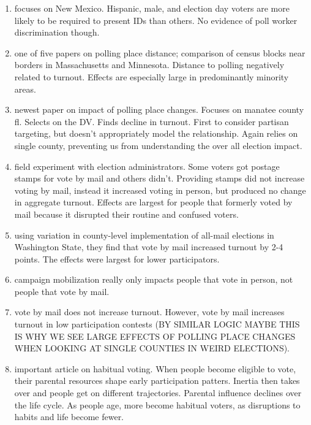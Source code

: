 \documentclass[12pt]{article}
\begin{document}
\begin{enumerate}
\item \citet{atkeson2010new} focuses on New Mexico. Hispanic, male, and election day voters are more likely to be required to present IDs than others. No evidence of poll worker discrimination though. 

\item \citet{cantoni2016} one of five papers on polling place distance;  comparison of census blocks near borders in Massachusetts and Minnesota. Distance to polling negatively related to turnout. Effects are especially large in predominantly minority areas. 



\item \citet{amos2017reprecincting} newest paper on impact of polling place changes. Focuses on manatee county fl. Selects on the DV. Finds decline in turnout. First to consider partisan targeting, but doesn't appropriately model the relationship. Again relies on single county, preventing us from understanding the over all election impact. 

\item \citet{michelson2012effect} field experiment with election administrators. Some voters got postage stamps for vote by mail and others didn't. Providing stamps did not increase voting by mail, instead it increased voting in person, but produced no change in aggregate turnout. Effects are largest for people that formerly voted by mail because it disrupted their routine and confused voters. 


\item \citet{gerber2013identifying} using variation in county-level implementation of all-mail elections in Washington State, they find that vote by mail increased turnout by 2-4 points. The effects were largest for lower participators. 

\item \citet{arceneaux2012get} campaign mobilization really only impacts people that vote in person, not people that vote by mail. 

\item \citet{kousser2007does} vote by mail does not increase turnout. However, vote by mail increases turnout in low participation contests (BY SIMILAR LOGIC MAYBE THIS IS WHY WE SEE LARGE EFFECTS OF POLLING PLACE CHANGES WHEN LOOKING AT SINGLE COUNTIES IN WEIRD ELECTIONS). 

\item \citet{plutzer2002becoming} important article on habitual voting. When people become eligible to vote, their parental resources shape early participation patters. Inertia then takes over and people get on different trajectories. Parental influence declines over the life cycle. As people age, more become habitual voters, as disruptions to habits and life become fewer. 



\end{enumerate}
\end{document}
